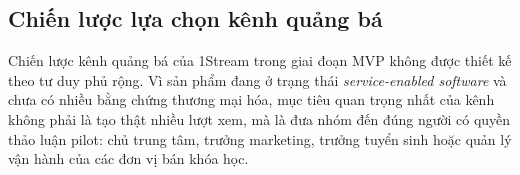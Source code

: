 %
%
%
%
%

\subsection{Chiến lược lựa chọn kênh quảng bá}

Chiến lược kênh quảng bá của 1Stream trong giai đoạn MVP không được thiết kế theo
tư duy phủ rộng. Vì sản phẩm đang ở trạng thái \textit{service-enabled software}
và chưa có nhiều bằng chứng thương mại hóa, mục tiêu quan trọng nhất của kênh
không phải là tạo thật nhiều lượt xem, mà là đưa nhóm đến đúng người có quyền
thảo luận pilot: chủ trung tâm, trưởng marketing, trưởng tuyển sinh hoặc quản lý
vận hành của các đơn vị bán khóa học.

